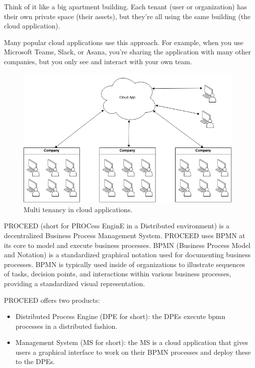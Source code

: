 Think of it like a big apartment building. Each tenant (user or organization) has their
own private space (their assets), but they're all using the same building (the
cloud application).

Many popular cloud applications use this approach. For example, when you use Microsoft Teams,
Slack, or Asana, you're sharing the application with many other companies, but you only
see and interact with your own team.

\begin{figure}[H]
    \centering
    \includegraphics[scale=0.45]{images/mt-cloud-services.png}
    \caption{Multi tenancy in cloud applications.}
    \vspace{-1em} %
    \label{fig:multi-tenant=cloud-applications}
\end{figure}

PROCEED (short for PROCess EnginE in a Distributed environment) %
is a decentralized Business Process Management System.
PROCEED uses BPMN at its core to model and execute business processes.
BPMN (Business Process Model and Notation) is a standardized graphical notation used for documenting business processes.
BPMN is typically used inside of organizations to illustrate sequences of tasks,
decision points, and interactions within various business processes, providing a standardized visual representation.

PROCEED offers two products:
\begin{itemize}
    \item Distributed Process Engine (DPE for short): the DPEs execute bpmn processes in a distributed fashion.
    \item Management System (MS for short): the MS is a cloud application that gives users
      a graphical interface to work on their BPMN processes and deploy these to the DPEs.
\end{itemize}

